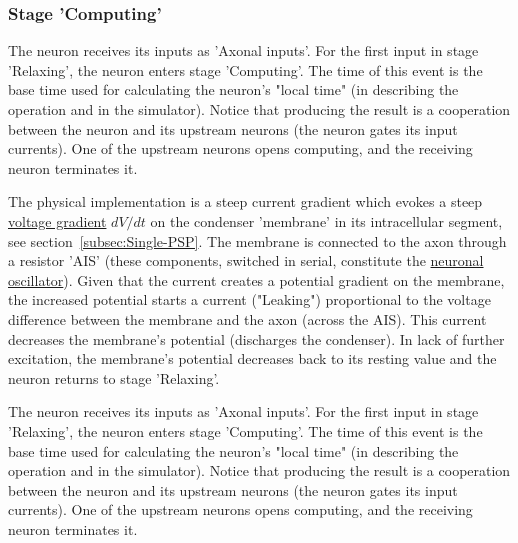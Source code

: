 \else
 



\subsubsection[Computing]{Stage 'Computing'\label{sec:Single-OperationComputing}}
\fi

\ifx\magyar\undefined


The neuron receives its inputs as 'Axonal inputs'. For the first input in stage 'Relaxing',
the neuron enters stage 'Computing'. 
The  time of this event is the base time used for calculating the neuron's "local time" (in describing the operation and in the simulator). 
Notice that producing the result is a cooperation 
between the neuron and its upstream neurons (the neuron gates its input currents). One of the upstream neurons
opens computing, and the receiving neuron terminates it.


The physical implementation is
a steep current gradient which evokes a steep \hyperlink{voltage_gradient}{voltage gradient} $dV/dt$
on the condenser 'membrane' in its intracellular segment, see section~\ref{subsec:Single-PSP}. 
The membrane is connected to the axon through a resistor 
'AIS'
(these components, switched in serial, constitute the \hyperlink{PhysicsOscillator}{neuronal oscillator}).
Given that the current creates a potential gradient on the membrane, the 
increased potential starts a current ("Leaking") proportional to the voltage difference
between the membrane and the axon (across the AIS). This current decreases
the membrane's potential (discharges the condenser). In lack of further 
excitation, the membrane's potential decreases back to its resting value
and the neuron returns to stage 'Relaxing'.

\else


The neuron receives its inputs as 'Axonal inputs'. For the first input in stage 'Relaxing',
the neuron enters stage 'Computing'. 
The  time of this event is the base time used for calculating the neuron's "local time" (in describing the operation and in the simulator). 
Notice that producing the result is a cooperation 
between the neuron and its upstream neurons (the neuron gates its input currents). One of the upstream neurons
opens computing, and the receiving neuron terminates it.


